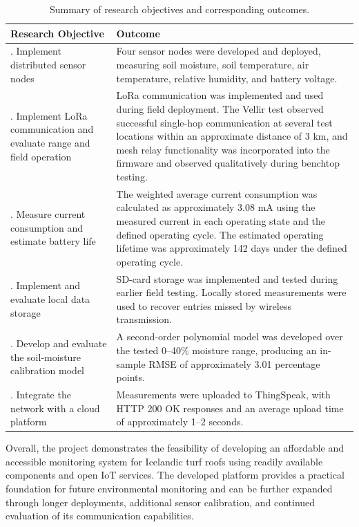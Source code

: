 \begin{table}[htbp]
\centering
\caption{Summary of research objectives and corresponding outcomes.}
\label{tab:objective-assessment}
\begingroup
\small
\begin{tabularx}{\textwidth}{@{}>{\raggedright\arraybackslash}p{}>{\raggedright\arraybackslash}X@{}}
\toprule
\textbf{Research Objective} & \textbf{Outcome} \\
\midrule
1. Implement distributed sensor nodes & Four sensor nodes were developed and deployed, measuring soil moisture, soil temperature, air temperature, relative humidity, and battery voltage. \\
2. Implement LoRa communication and evaluate range and field operation & LoRa communication was implemented and used during field deployment. The Vellir test observed successful single-hop communication at several test locations within an approximate distance of 3 km, and mesh relay functionality was incorporated into the firmware and observed qualitatively during benchtop testing. \\
3. Measure current consumption and estimate battery life & The weighted average current consumption was calculated as approximately 3.08 mA using the measured current in each operating state and the defined operating cycle. The estimated operating lifetime was approximately 142 days under the defined operating cycle. \\
4. Implement and evaluate local data storage & SD-card storage was implemented and tested during earlier field testing. Locally stored measurements were used to recover entries missed by wireless transmission. \\
5. Develop and evaluate the soil-moisture calibration model & A second-order polynomial model was developed over the tested 0--40\% moisture range, producing an in-sample RMSE of approximately 3.01 percentage points. \\
6. Integrate the network with a cloud platform & Measurements were uploaded to ThingSpeak, with HTTP 200 OK responses and an average upload time of approximately 1--2 seconds. \\
\bottomrule
\end{tabularx}
\endgroup
\end{table}

Overall, the project demonstrates the feasibility of developing an affordable and accessible monitoring system for Icelandic turf roofs using readily available components and open IoT services. The developed platform provides a practical foundation for future environmental monitoring and can be further expanded through longer deployments, additional sensor calibration, and continued evaluation of its communication capabilities.

